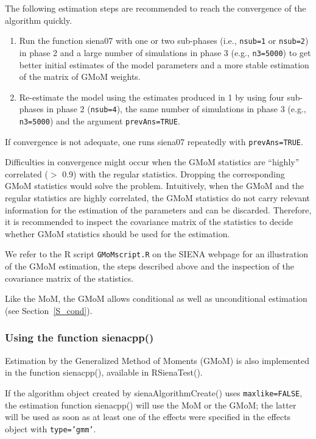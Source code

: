 \documentclass[a4paper,fleqn,11pt]{article}
\newcommand{\+}{\, + \,}
\newcommand{\sfn}[1]{\textsf{#1}}
\newcommand{\R}{{\sf R }}
\newcommand{\SI}{{\sf SIENA }}
\begin{document}
The following estimation steps are recommended to reach the convergence of the algorithm quickly.
\begin{enumerate}
	\item  Run the function \sfn{siena07} with one or two sub-phases (i.e.,
\texttt{nsub=1} or \texttt{nsub=2}) in phase 2 and a large number of simulations in phase 3
(e.g., \texttt{n3=5000}) to get better initial estimates of the model parameters and a
more stable estimation of the matrix of GMoM weights.
 \item Re-estimate the model using the estimates produced in 1 by using four sub-phases in phase 2
(\texttt{nsub=4}), the same number of simulations in phase 3 (e.g., \texttt{n3=5000}) and the
argument \texttt{prevAns=TRUE}.
\end{enumerate}
If convergence is not adequate, one runs \sfn{siena07} repeatedly with \texttt{prevAns=TRUE}.

Difficulties in convergence might occur when the GMoM statistics are ``highly'' correlated ($>$ 0.9) with the regular statistics. Dropping the corresponding GMoM statistics would solve the problem. Intuitively, when the GMoM and the regular statistics are highly correlated, the GMoM statistics do not carry relevant information
for the estimation of the parameters and can be discarded. Therefore, it is recommended to inspect the covariance matrix of the statistics to decide whether GMoM statistics should be used for the estimation.

We refer to  the  \R script \texttt{GMoMscript.R} on the \SI webpage for an illustration of the GMoM estimation, the steps described above and the inspection of the covariance matrix of the statistics.

Like the MoM, the GMoM allows conditional as well as unconditional estimation (see Section~\ref{S_cond}).


\subsubsection{Using the function \sfn{sienacpp()}}
\label{S_GMoM_sienacpp}

Estimation by the Generalized Method of Moments (GMoM) is also implemented
in the function \sfn{sienacpp()}, available in \sfn{RSienaTest()}.

If the algorithm object created by \sfn{sienaAlgorithmCreate()}
uses \texttt{maxlike=FALSE}, the estimation function \sfn{sienacpp()}
will use the MoM or the GMoM; the latter will be used as soon as
at least one of the effects were specified in the effects object with
\texttt{type='gmm'}.
\end{document}
